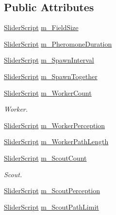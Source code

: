 \subsection*{Public Attributes}
\begin{DoxyCompactItemize}
\item 
\mbox{\hyperlink{class_slider_script}{Slider\+Script}} \mbox{\hyperlink{class_option_manager_aea90a45fd893dc64ba1eefe6429a5252}{m\+\_\+\+Field\+Size}}
\item 
\mbox{\hyperlink{class_slider_script}{Slider\+Script}} \mbox{\hyperlink{class_option_manager_ab4e9e361518e6046f3db47f71a9aff63}{m\+\_\+\+Pheromone\+Duration}}
\item 
\mbox{\hyperlink{class_slider_script}{Slider\+Script}} \mbox{\hyperlink{class_option_manager_a7ebda3c3798e208a63da64e60c53c299}{m\+\_\+\+Spawn\+Interval}}
\item 
\mbox{\hyperlink{class_slider_script}{Slider\+Script}} \mbox{\hyperlink{class_option_manager_a4438df0866c014d59ce554dda2ec50f4}{m\+\_\+\+Spawn\+Together}}
\item 
\mbox{\hyperlink{class_slider_script}{Slider\+Script}} \mbox{\hyperlink{class_option_manager_aad201e216e073633a2b4c89cc9bea9eb}{m\+\_\+\+Worker\+Count}}
\begin{DoxyCompactList}\small\item\em Worker. \end{DoxyCompactList}\item 
\mbox{\hyperlink{class_slider_script}{Slider\+Script}} \mbox{\hyperlink{class_option_manager_a081a54968d9c11233e97c1cc843f64df}{m\+\_\+\+Worker\+Perception}}
\item 
\mbox{\hyperlink{class_slider_script}{Slider\+Script}} \mbox{\hyperlink{class_option_manager_ab10e909056d1142dc8ca3975299bd68f}{m\+\_\+\+Worker\+Path\+Length}}
\item 
\mbox{\hyperlink{class_slider_script}{Slider\+Script}} \mbox{\hyperlink{class_option_manager_a1f0b5cd4754d9c8037792cc7e77e9517}{m\+\_\+\+Scout\+Count}}
\begin{DoxyCompactList}\small\item\em Scout. \end{DoxyCompactList}\item 
\mbox{\hyperlink{class_slider_script}{Slider\+Script}} \mbox{\hyperlink{class_option_manager_a1a850dea4a16a31fd58439eb6a292b60}{m\+\_\+\+Scout\+Perception}}
\item 
\mbox{\hyperlink{class_slider_script}{Slider\+Script}} \mbox{\hyperlink{class_option_manager_a7f7d0491ae0349a699636c6d9ced6288}{m\+\_\+\+Scout\+Path\+Limit}}
\end{DoxyCompactItemize}


